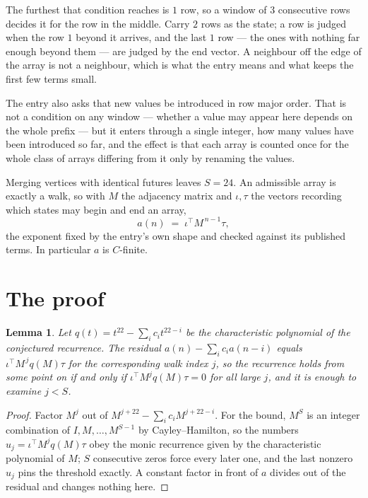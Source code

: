 \documentclass[11pt,a4paper]{article}
\theoremstyle{plain}
\newtheorem{lemma}[theorem]{Lemma}
\theoremstyle{definition}
\begin{document}
The furthest that condition reaches is $1$ row, so a window of $3$ consecutive rows decides it for the row in the middle. Carry $2$ rows as the state; a row is judged when the row $1$ beyond it arrives, and the last $1$ row --- the ones with nothing far enough beyond them --- are judged by the end vector. A neighbour off the edge of the array is not a neighbour, which is what the entry means and what keeps the first few terms small.

The entry also asks that new values be introduced in row major order. That is not a condition on any window --- whether a value may appear here depends on the whole prefix --- but it enters through a single integer, how many values have been introduced so far, and the effect is that each array is counted once for the whole class of arrays differing from it only by renaming the values.

Merging vertices with identical futures leaves $S=24$. An admissible array is exactly a walk, so with $M$ the adjacency matrix and $\iota,\tau$ the vectors recording which states may begin and end an array,
\[
a(n)\;=\;\iota^{\!\top}M^{\,n-1}\tau ,
\]
the exponent fixed by the entry's own shape and checked against its published terms. In
particular $a$ is $C$-finite.

\section{The proof}

\begin{lemma}\label{lem:crit}
Let $q(t)=t^{22}-\sum_i c_it^{22-i}$ be the characteristic polynomial of the
conjectured recurrence. The residual $a(n)-\sum_ic_ia(n-i)$ equals
$\iota^{\!\top}M^{\,j}q(M)\tau$ for the corresponding walk index $j$, so the recurrence
holds from some point on if and only if $\iota^{\!\top}M^{j}q(M)\tau=0$ for all large $j$,
and it is enough to examine $j<S$.
\end{lemma}

\begin{proof}
Factor $M^{j}$ out of $M^{j+22}-\sum_ic_iM^{j+22-i}$. For the bound, $M^{S}$
is an integer combination of $I,M,\dots,M^{S-1}$ by Cayley--Hamilton, so the numbers
$u_j=\iota^{\!\top}M^{j}q(M)\tau$ obey the monic recurrence given by the characteristic
polynomial of $M$; $S$ consecutive zeros force every later one, and the last nonzero $u_j$
pins the threshold exactly. A constant factor in front of $a$ divides out of the residual and
changes nothing here.
\end{proof}
\end{document}
